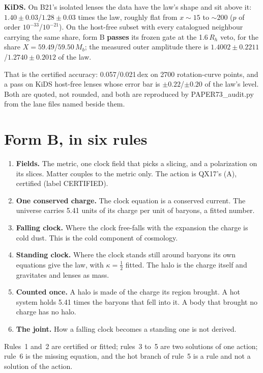 \documentclass[10pt]{article}
\begin{document}
\textbf{KiDS.} On B21's isolated lenses the data have the law's shape and sit above it: $1.40\pm0.03$/$1.28\pm0.03$ times
the law, roughly flat from $x\sim15$ to $\sim200$ ($p$ of order $10^{-33}$/$10^{-21}$). On the host-free subset with every
catalogued neighbour carrying the same share, form B {\bf passes} its frozen gate at the 1.6\,$R_h$ veto, for the share
$X=59.49$/$59.50\,M_b$; the measured outer amplitude there is $1.4002\pm0.2211$/$1.2740\pm0.2012$ of the law.

That is the certified accuracy: 0.057/0.021\,dex on 2700 rotation-curve points, and a pass on KiDS host-free lenses whose
error bar is $\pm0.22$/$\pm0.20$ of the law's level. Both are quoted, not rounded, and both are reproduced by
PAPER73\_audit.py from the lane files named beside them.

\section{Form B, in six rules}
\begin{enumerate}
\item \textbf{Fields.} The metric, one clock field that picks a slicing, and a polarization on its slices.
  Matter couples to the metric only. The action is QX17's (A), certified (label CERTIFIED).
\item \textbf{One conserved charge.} The clock equation is a conserved current. The universe carries 5.41 units of its
  charge per unit of baryons, a fitted number.
\item \textbf{Falling clock.} Where the clock free-falls with the expansion the charge is cold dust. This is the cold
  component of cosmology.
\item \textbf{Standing clock.} Where the clock stands still around baryons its own equations give the law, with
  $\kappa=\tfrac12$ fitted. The halo is the charge itself and gravitates and lenses as mass.
\item \textbf{Counted once.} A halo is made of the charge its region brought. A hot system holds 5.41 times the baryons
  that fell into it. A body that brought no charge has no halo.
\item \textbf{The joint.} How a falling clock becomes a standing one is not derived.
\end{enumerate}
Rules~1 and~2 are certified or fitted; rules~3 to~5 are two solutions of one action; rule~6 is the missing equation,
and the hot branch of rule~5 is a rule and not a solution of the action.
\end{document}
